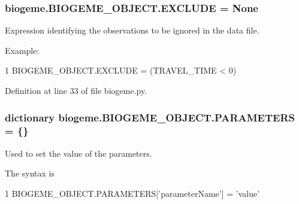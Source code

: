 \subsubsection[{\texorpdfstring{E\+X\+C\+L\+U\+DE}{EXCLUDE}}]{\setlength{\rightskip}{0pt plus 5cm}biogeme.\+B\+I\+O\+G\+E\+M\+E\+\_\+\+O\+B\+J\+E\+C\+T.\+E\+X\+C\+L\+U\+DE = None\hspace{0.3cm}{\ttfamily [static]}}\hypertarget{classbiogeme_1_1_b_i_o_g_e_m_e___o_b_j_e_c_t_a599c398c094f98e58d93b96c2dc81b97}{}\label{classbiogeme_1_1_b_i_o_g_e_m_e___o_b_j_e_c_t_a599c398c094f98e58d93b96c2dc81b97}


Expression identifying the observations to be ignored in the data file. 

Example\+: 
\begin{DoxyCode}
1 BIOGEME\_OBJECT.EXCLUDE = (TRAVEL\_TIME < 0)
\end{DoxyCode}
 

Definition at line 33 of file biogeme.\+py.

\subsubsection[{\texorpdfstring{P\+A\+R\+A\+M\+E\+T\+E\+RS}{PARAMETERS}}]{\setlength{\rightskip}{0pt plus 5cm}dictionary biogeme.\+B\+I\+O\+G\+E\+M\+E\+\_\+\+O\+B\+J\+E\+C\+T.\+P\+A\+R\+A\+M\+E\+T\+E\+RS = \{\}\hspace{0.3cm}{\ttfamily [static]}}\hypertarget{classbiogeme_1_1_b_i_o_g_e_m_e___o_b_j_e_c_t_a3f178e0954e495b10c6f08083f1ed7f7}{}\label{classbiogeme_1_1_b_i_o_g_e_m_e___o_b_j_e_c_t_a3f178e0954e495b10c6f08083f1ed7f7}


Used to set the value of the parameters. 

The syntax is 
\begin{DoxyCode}
1 BIOGEME\_OBJECT.PARAMETERS[\textcolor{stringliteral}{'parameterName'}] = \textcolor{stringliteral}{'value'} 
\end{DoxyCode}
 


